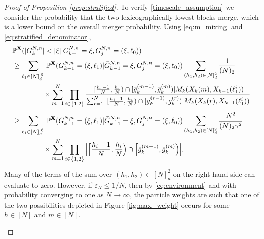 \documentclass[10pt,a4paper]{amsart}
\newcommand{\bbP}{\mathbb{P}}
\newcommand{\bfX}{\mathbf{X}}
\begin{document}
\begin{proof}[Proof of Proposition \ref{prop:stratified}]
To verify \eqref{timescale_assumption} we consider the probability that the two lexicographically lowest blocks merge, which is a lower bound on the overall merger probability.
Using \eqref{eq:m_mixing} and \eqref{eq:stratified_denominator},
\begin{align}
&\bbP^{ \bfX }( | \bar{ G }_k^{ N, n } | < | \xi | | \bar{ G }_{ k - 1 }^{ N, n } = \xi, G_j^{ N, n } = ( \xi, \ell_0 ) ) \notag \\
&\geq \sum_{ \ell_1 \in [ N ]_d^{ | \xi | } } \bbP^{ \bfX }( G_{ k - 1 }^{ N, n } = ( \xi, \ell_1 ) | \bar{ G }_{ k - 1 }^{ N, n } = \xi, G_j^{ N, n } = ( \xi, \ell_0 ) ) \sum_{ ( h_1, h_2 ) \in [ N ]_d^2 }  \frac{ 1 }{ ( N )_2 } \notag \\
&\phantom{= \sum_{ \ell_1 \in [ N ]_d^{ | \xi | } } } \times \sum_{ m = 1 }^N \prod_{ i \in \{ 1, 2 \} } \frac{ | [ \frac{ h_i - 1 }{ N }, \frac{ h_i }{ N } ) \cap [ \bar{ g }_k^{ ( m - 1 ) }, \bar{ g }_k^{ ( m ) } ) | M_k( X_k( m ), X_{ k - 1 }( \ell_1^i ) ) }{ \sum_{ r = 1 }^N | [ \frac{ h_i - 1 }{ N }, \frac{ h_i }{ N } ) \cap [ \bar{ g }_k^{ ( r - 1 ) }, \bar{ g }_k^{ ( r ) } ) | M_k( X_k( r ), X_{ k - 1 }( \ell_1^i ) ) } \notag \\
&\geq \sum_{ \ell_1 \in [ N ]_d^{ | \xi | } } \bbP^{ \bfX }( G_{ k - 1 }^{ N, n } = ( \xi, \ell_1 ) | \bar{ G }_{ k - 1 }^{ N, n } = \xi, G_j^{ N, n } = ( \xi, \ell_0 ) ) \sum_{ ( h_1, h_2 ) \in [ N ]_d^2 }  \frac{ N^2 }{ ( N )_2 \gamma^2 } \notag \\
&\phantom{= \sum_{ \ell_1 \in [ N ]_d^{ | \xi | } } } \times \sum_{ m = 1 }^N \prod_{ i \in \{ 1, 2 \} } \Big| \Big[ \frac{ h_i - 1 }{ N }, \frac{ h_i }{ N } \Big) \cap \Big[ \bar{ g }_k^{ ( m - 1 ) }, \bar{ g }_k^{ ( m ) } \Big) \Big|. \label{stratified_lb_start}
\end{align}
Many of the terms of the sum over $(h_1, h_2) \in [N]_d^2$ on the right-hand side can evaluate to zero.
However, if $\varepsilon_N \leq 1/N$, then by \eqref{eq:environment} and with probability converging to one as $N \to \infty$, the particle weights are such that one of the two possibilities depicted in Figure \ref{fig:max_weight} occurs for some $h \in [N]$ and $m \in [N]$.
\begin{figure}[!ht]
\centering
\end{figure}
\end{proof}
\end{document}
